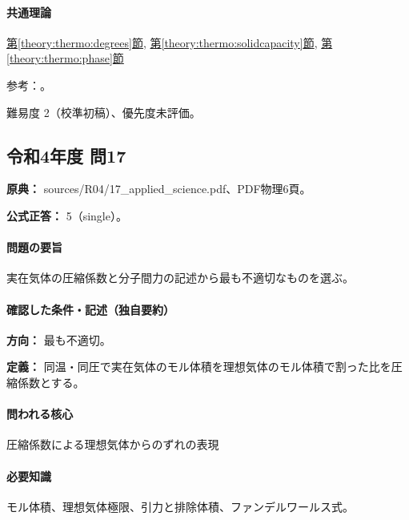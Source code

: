 \paragraph{共通理論} \hyperref[theory:thermo:degrees]{第\ref*{theory:thermo:degrees}節}, \hyperref[theory:thermo:solidcapacity]{第\ref*{theory:thermo:solidcapacity}節}, \hyperref[theory:thermo:phase]{第\ref*{theory:thermo:phase}節}

\par 参考：\cite{mit_electronic_heat2012,mit_debye2005}。

\par 難易度 2（校準初稿）、優先度未評価。

\subsection{令和4年度 問17}
\label{q:r04-reg-applied-17}

\noindent\textbf{原典：} sources/R04/17\_applied\_science.pdf、PDF物理6頁。

\textbf{公式正答：} 5（single）。

\paragraph{問題の要旨} 実在気体の圧縮係数と分子間力の記述から最も不適切なものを選ぶ。

\paragraph{確認した条件・記述（独自要約）}\mbox{}\par

\noindent\textbf{方向：} 最も不適切。\par

\noindent\textbf{定義：} 同温・同圧で実在気体のモル体積を理想気体のモル体積で割った比を圧縮係数とする。\par

\paragraph{問われる核心} 圧縮係数による理想気体からのずれの表現

\paragraph{必要知識} モル体積、理想気体極限、引力と排除体積、ファンデルワールス式。

